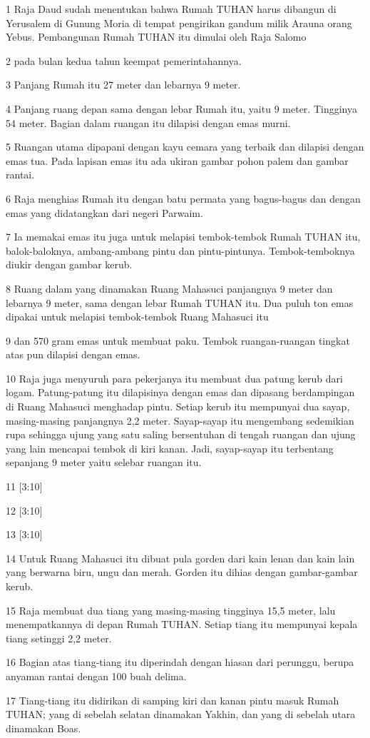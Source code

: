 \par 1 Raja Daud sudah menentukan bahwa Rumah TUHAN harus dibangun di Yerusalem di Gunung Moria di tempat pengirikan gandum milik Arauna orang Yebus. Pembangunan Rumah TUHAN itu dimulai oleh Raja Salomo
\par 2 pada bulan kedua tahun keempat pemerintahannya.
\par 3 Panjang Rumah itu 27 meter dan lebarnya 9 meter.
\par 4 Panjang ruang depan sama dengan lebar Rumah itu, yaitu 9 meter. Tingginya 54 meter. Bagian dalam ruangan itu dilapisi dengan emas murni.
\par 5 Ruangan utama dipapani dengan kayu cemara yang terbaik dan dilapisi dengan emas tua. Pada lapisan emas itu ada ukiran gambar pohon palem dan gambar rantai.
\par 6 Raja menghias Rumah itu dengan batu permata yang bagus-bagus dan dengan emas yang didatangkan dari negeri Parwaim.
\par 7 Ia memakai emas itu juga untuk melapisi tembok-tembok Rumah TUHAN itu, balok-baloknya, ambang-ambang pintu dan pintu-pintunya. Tembok-temboknya diukir dengan gambar kerub.
\par 8 Ruang dalam yang dinamakan Ruang Mahasuci panjangnya 9 meter dan lebarnya 9 meter, sama dengan lebar Rumah TUHAN itu. Dua puluh ton emas dipakai untuk melapisi tembok-tembok Ruang Mahasuci itu
\par 9 dan 570 gram emas untuk membuat paku. Tembok ruangan-ruangan tingkat atas pun dilapisi dengan emas.
\par 10 Raja juga menyuruh para pekerjanya itu membuat dua patung kerub dari logam. Patung-patung itu dilapisinya dengan emas dan dipasang berdampingan di Ruang Mahasuci menghadap pintu. Setiap kerub itu mempunyai dua sayap, masing-masing panjangnya 2,2 meter. Sayap-sayap itu mengembang sedemikian rupa sehingga ujung yang satu saling bersentuhan di tengah ruangan dan ujung yang lain mencapai tembok di kiri kanan. Jadi, sayap-sayap itu terbentang sepanjang 9 meter yaitu selebar ruangan itu.
\par 11 [3:10]
\par 12 [3:10]
\par 13 [3:10]
\par 14 Untuk Ruang Mahasuci itu dibuat pula gorden dari kain lenan dan kain lain yang berwarna biru, ungu dan merah. Gorden itu dihias dengan gambar-gambar kerub.
\par 15 Raja membuat dua tiang yang masing-masing tingginya 15,5 meter, lalu menempatkannya di depan Rumah TUHAN. Setiap tiang itu mempunyai kepala tiang setinggi 2,2 meter.
\par 16 Bagian atas tiang-tiang itu diperindah dengan hiasan dari perunggu, berupa anyaman rantai dengan 100 buah delima.
\par 17 Tiang-tiang itu didirikan di samping kiri dan kanan pintu masuk Rumah TUHAN; yang di sebelah selatan dinamakan Yakhin, dan yang di sebelah utara dinamakan Boas.

